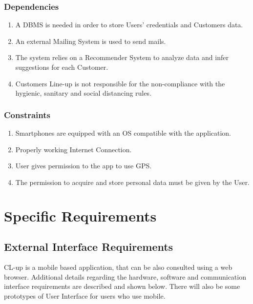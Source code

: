 \documentclass[a4paper, 12pt, oneside]{article}
\begin{document}
\subsubsection{Dependencies}
\begin{enumerate}
    \item A DBMS is needed in order to store Users' credentials and Customers data.
    \item An external Mailing System is used to send mails.
    \item The system relies on a Recommender System to analyze data and infer suggestions for each Customer.
    \item Customers Line-up is not responsible for the non-compliance with the hygienic, sanitary and social distancing rules.
    
\end{enumerate}
\subsubsection{Constraints}
\begin{enumerate}
    \item Smartphones are equipped with an OS compatible with the application.
    \item Properly working Internet Connection.
    \item User gives permission to the app to use GPS.
    \item The permission to acquire and store personal data must be given by the User.
\end{enumerate}
\newpage
\section{Specific Requirements}
\label{specificRequirements}
\subsection{External Interface Requirements}
CL-up is a mobile based application, that can be also consulted using a web browser. Additional details regarding the hardware, software and communication interface requirements are described and shown below. There will also be some prototypes of User Interface for users who use mobile.
\end{document}
